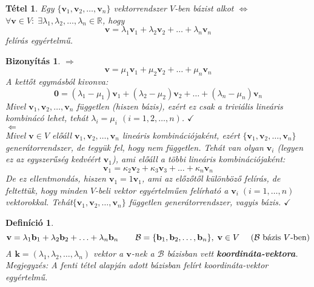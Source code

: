 \documentclass[a4paper,12pt,twoside]{book}
\newcommand{\vek}[1]{\mathbf{#1}} %
\newcommand{\ve}[2]{\mathbf{#1}_{#2}} %
\newcommand{\lista}[2]{{#1}_{1}, {#1}_{2}, \ldots, {#1}_{#2}}
\newcommand{\linkomb}[3]{#2_1\vek{#1}_{1} + #2_2\vek{#1}_{2} + \ldots + #2_{#3}\vek{#1}_{#3}}
\newcommand{\R}{\mathbb{R}}
\newtheorem{defi}{Definíció}[chapter]
\newtheorem{tetel}{Tétel}[chapter]
\theoremstyle{break}
\newtheorem{bizNL}[biz]{Bizonyítás}
\begin{document}
\begin{tetel} Egy $\{\lista{\vek{v}}{n}\}$ vektorrendszer $V$-ben \textit{bázis}t alkot $\Leftrightarrow$ 
 $\forall \vek{v} \in V: \; \exists \lista{\lambda}{n} \in \R$, hogy
  \[\vek{v} = \linkomb{v}{\lambda}{n}\]
  felírás egyértelmű.
\end{tetel}
\begin{bizNL}
$\Rightarrow$\\
 \[\vek{v} = \linkomb{v}{\mu}{n}\]
  A kettőt egymásból kivonva:
  \[\vek{0} =  (\lambda_1-\mu_1)\vek{v}_1+(\lambda_2-\mu_2)\vek{v}_2+\ldots+(\lambda_n-\mu_n)\vek{v}_n\]
  Mivel $\lista{\vek{v}}{n}$ független (hiszen bázis), ezért ez csak a triviális lineáris kombinácó lehet, tehát $\lambda_i = \mu_i$ $(i = 1,2,\ldots,n)$. $\checkmark$\\

$\Leftarrow$\\
 Mivel $\vek{v} \in V$ előáll $\lista{\vek{v}}{n}$ lineáris kombinációjaként, ezért $\{\lista{\vek{v}}{n}\}$ generátor\-rendszer, de tegyük fel, hogy nem független. Tehát van olyan $\vek{v}_i$ (legyen ez az egyszerűség kedvéért $\vek{v}_1$), ami előáll a többi lineáris kombinációjaként:
 \[\vek{v}_1 = \kappa_2\vek{v}_2+\kappa_3\vek{v}_3+\ldots+\kappa_n\vek{v}_n\]
De ez ellentmondás, hiszen $\vek{v}_1 = 1\vek{v}_1$, ami az előzőtől különböző felírás, de feltettük, hogy minden $V$-beli vektor egyértelműen felírható a $\vek{v}_i\; (i=1,\ldots,n)$ vektorokkal. Tehát\linebreak $\{\lista{\vek{v}}{n}\}$ független generátorrendszer, vagyis bázis. $\checkmark$
\end{bizNL}

\begin{defi}
 \[\vek{v} = \linkomb{b}{\lambda}{n} \qquad \mathcal{B}=\{\ve{b}{1}, \ve{b}{2}, \ldots, \ve{b}{n}\},\; \vek{v} \in V \quad \hbox{ ($\mathcal{B}$ bázis $V$-ben)}\]
A $\vek{k} = (\lista{\lambda}{n})$ vektor a $\vek{v}$-nek a $\mathcal{B}$ bázisban vett \textbf{koordináta-vektora}.\\
\emph{Megjegyzés}: A fenti tétel alapján adott bázisban felírt koordináta-vektor egyértelmű.
\end{defi}
\end{document}
